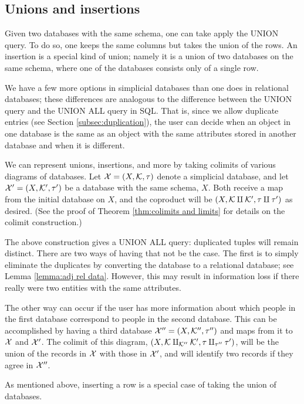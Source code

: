 \documentclass{amsart}
\begin{document}
\subsection{Unions and insertions}

Given two databases with the same schema, one can take apply the UNION query.  To do so, one keeps the same columns but takes the union of the rows.  An insertion is a special kind of union; namely it is a union of two databases on the same schema, where one of the databases consists only of a single row.

We have a few more options in simplicial databases than one does in relational databases; these differences are analogous to the difference between the UNION query and the UNION ALL query in SQL.  That is, since we allow duplicate entries (see Section \ref{subsec:duplication}), the user can decide when an object in one database is the same as an object with the same attributes stored in another database and when it is different.  

We can represent unions, insertions, and more by taking colimits of various diagrams of databases.  Let $\mathcal{X}=(X,\mathcal{K},\tau)$ denote a simplicial database, and let $\mathcal{X}'=(X,\mathcal{K}',\tau')$ be a database with the same schema, $X$.  Both receive a map from the initial database on $X$, and the coproduct will be $(X,\mathcal{K}\amalg\mathcal{K}',\tau\amalg\tau')$ as desired.  (See the proof of Theorem \ref{thm:colimits and limits} for details on the colimit construction.)

The above construction gives a UNION ALL query: duplicated tuples will remain distinct.  There are two ways of having that not be the case.  The first is to simply eliminate the duplicates by converting the database to a relational database; see Lemma \ref{lemma:adj rel data}.  However, this may result in information loss if there really were two entities with the same attributes.

The other way can occur if the user has more information about which people in the first database correspond to people in the second database.  This can be accomplished by having a third database $\mathcal{X}''=(X,\mathcal{K}'',\tau'')$ and maps from it to $\mathcal{X}$ and $\mathcal{X}'$.  The colimit of this diagram, $(X,\mathcal{K}\amalg_{\mathcal{K}''}\mathcal{K}',\tau\amalg_{\tau''}\tau')$, will be the union of the records in $\mathcal{X}$ with those in $\mathcal{X}'$, and will identify two records if they agree in $\mathcal{X}''$.

As mentioned above, inserting a row is a special case of taking the union of databases.
\end{document}
